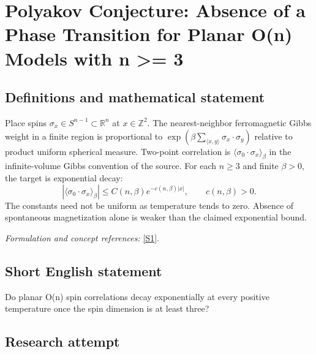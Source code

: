 \documentclass[11pt,a4paper]{article}
\newcommand{\Z}{\mathbb{Z}}
\newcommand{\R}{\mathbb{R}}
\newcommand{\sref}[2]{\hyperlink{source:#1:#2}{[S#2]}}
\newif\ifshowcatalogue
\newcommand{\cataloguescope}[1]{\ifshowcatalogue
 \paragraph{Exact scope in the supplied catalogue.}
 \begin{quote}\small #1\end{quote}\fi}
\numberwithin{equation}{section}
\begin{document}
\setcounter{section}{186}
\clearpage
\section{\texorpdfstring{Polyakov Conjecture: Absence of a Phase Transition for Planar O(n) Models with n >= 3}{Polyakov Conjecture: Absence of a Phase Transition for Planar O(n) Models with n >= 3}}\label{187}
\subsection{Definitions and mathematical statement}
Place spins $\sigma_x\in S^{n-1}\subset\R^n$ at $x\in\Z^2$. The nearest-neighbor ferromagnetic Gibbs weight in a finite region is proportional to
$\exp(\beta\sum_{\langle x,y\rangle}\sigma_x\cdot\sigma_y)$ relative to product uniform spherical measure. Two-point correlation is $\langle\sigma_0\cdot\sigma_x\rangle_\beta$ in the infinite-volume Gibbs convention of the source. For each $n\ge3$ and finite $\beta>0$, the target is exponential decay:
\[
 |\langle\sigma_0\cdot\sigma_x\rangle_\beta|\le C(n,\beta)e^{-c(n,\beta)|x|},
 \qquad c(n,\beta)>0.
\]
The constants need not be uniform as temperature tends to zero. Absence of spontaneous magnetization alone is weaker than the claimed exponential bound.
\par\smallskip\textit{Formulation and concept references:} \sref{187}{1}.
\cataloguescope{For every integer n >= 3 and every finite inverse temperature beta > 0, prove that two-point correlations in the nearest-neighbor O(n) spin model on Z\textasciicircum{}2 decay exponentially with distance.}
\subsection{Short English statement}
Do planar O(n) spin correlations decay exponentially at every positive temperature once the spin dimension is at least three?
\subsection{Research attempt}
\end{document}
